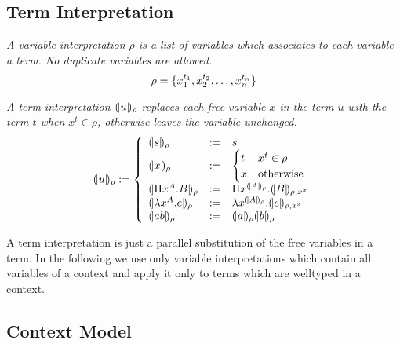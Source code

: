 \subsection{Term Interpretation}

\begin{definition}
    \emph{A variable interpretation $\rho$ is a list of variables which
    associates to each variable a term. No duplicate variables are allowed.}
    $$
        \rho = {\{x_1^{t_1}, x_2^{t_2}, \ldots, x_n^{t_n}\}}
    $$
\end{definition}


\begin{definition}
    \emph{A term interpretation ${(\!|u|\!)_{\rho}}$ replaces each free
    variable $x$ in the term $u$ with the term $t$ when $x^t \in \rho$,
    otherwise leaves the variable unchanged.}
    $$
    \terminter u \rho :=
    \left\{
    \begin{array}{lll}
        \terminter s \rho &:=& s
        \\
        \terminter x \rho &:=&
        \begin{cases}
            t & x^t \in \rho
            \\
            x & \text{otherwise}
        \end{cases}
        \\
        \terminter {\Pi x^A. B} \rho &:=&
        \Pi x^{\terminter A \rho} . \terminter B {\rho,x^x}
        \\
        \terminter {\lambda x^A. e} \rho &:=&
        \lambda x^{\terminter A \rho} . \terminter e {\rho,x^x}
        \\
        \terminter {a b} \rho &:=&
        \terminter a \rho \terminter b \rho
    \end{array}
    \right.
    $$
\end{definition}

A term interpretation is just a parallel substitution of the free variables in a
term. In the following we use only variable interpretations which contain all
variables of a context and apply it only to terms which are welltyped in a
context.






\subsection{Context Model}

